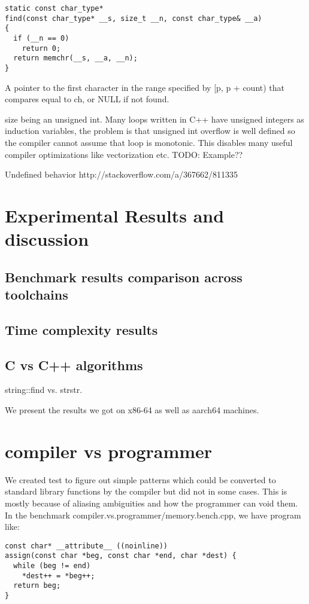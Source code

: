 \documentclass{sig-alternate}
\begin{document}
\begin{verbatim}
static const char_type*
find(const char_type* __s, size_t __n, const char_type& __a)
{
  if (__n == 0)
    return 0;
  return memchr(__s, __a, __n);
}
\end{verbatim}

A pointer to the first character in the range specified by [p, p + count) that
  compares equal to ch, or NULL if not found.


size being an unsigned int. Many loops written in C++ have unsigned integers
as induction variables, the problem is that unsigned int overflow is well
defined so the compiler cannot assume that loop is monotonic. This disables
many useful compiler optimizations like vectorization etc.
TODO: Example??

Undefined behavior
http://stackoverflow.com/a/367662/811335

\section{Experimental Results and discussion}
\label{sec:experiments}

\subsection{Benchmark results comparison across toolchains}

\subsection{Time complexity results}

\subsection{C vs C++ algorithms}
string::find vs. strstr.

We present the results we got on x86-64 as well as aarch64 machines.

\section{compiler vs programmer}
We created test to figure out simple patterns which could be converted to
standard library functions by the compiler but did not in some cases. This is
mostly because of aliasing ambiguities and how the programmer can void them.  In
the benchmark compiler.vs.programmer/memory.bench.cpp, we have program like:

\begin{verbatim}
const char* __attribute__ ((noinline))
assign(const char *beg, const char *end, char *dest) {
  while (beg != end)
    *dest++ = *beg++;
  return beg;
}
\end{verbatim}
\end{document}
